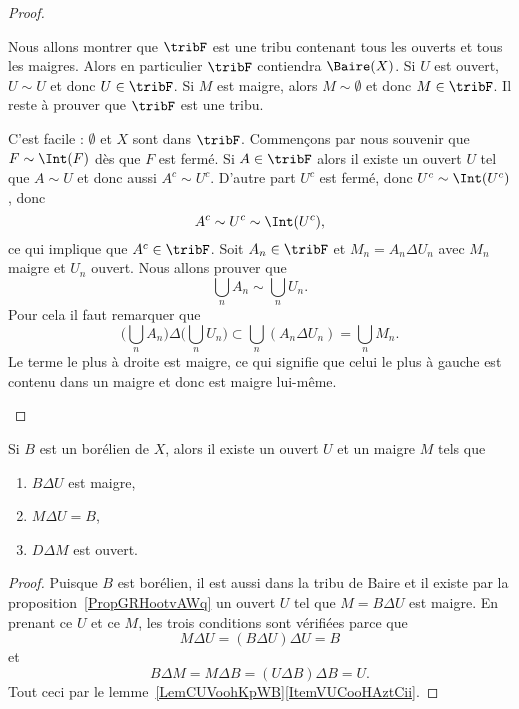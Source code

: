 \begin{proof}
\begin{subproof}
		Nous allons montrer que \( \tribF\) est une tribu contenant tous les ouverts et tous les maigres. Alors en particulier \( \tribF\) contiendra \( \Baire(X)\). Si \( U\) est ouvert, \( U\sim U\) et donc \( U\in\tribF\). Si \( M \) est maigre, alors \( M\sim\emptyset\) et donc \( M\in\tribF\). Il reste à prouver que \( \tribF\) est une tribu.
		\begin{subproof}
			 C'est facile : \( \emptyset\) et \( X\) sont dans \( \tribF\).
			\spitem[Comlémentaire] Commençons par nous souvenir que \( F\sim\Int(F)\) dès que \( F\) est fermé. Si \( A\in\tribF\) alors il existe un ouvert \( U\) tel que \( A\sim U\) et donc aussi \( A^c\sim U^c\). D'autre part \( U^c\) est fermé, donc \( U^c\sim\Int(U^c)\), donc
			\begin{equation}
				A^c\sim U^c\sim\Int(U^c),
			\end{equation}
			ce qui implique que \( A^c\in\tribF\).
			 Soit \( A_n\in\tribF\) et \( M_n=A_n\Delta U_n\) avec \( M_n\) maigre et \( U_n\) ouvert. Nous allons prouver que
			\begin{equation}
				\bigcup_nA_n\sim\bigcup_nU_n.
			\end{equation}
			Pour cela il faut remarquer que
			\begin{equation}
				\Big( \bigcup_nA_n \Big)\Delta\Big( \bigcup_nU_n \Big)\subset\bigcup_n(A_n\Delta U_n)=\bigcup_nM_n.
			\end{equation}
			Le terme le plus à droite est maigre, ce qui signifie que celui le plus à gauche est contenu dans un maigre et donc est maigre lui-même.
		\end{subproof}
	\end{subproof}
\end{proof}

\begin{proposition}
	Si \( B\) est un borélien de \( X\), alors il existe un ouvert \( U\) et un maigre \( M\) tels que
	\begin{enumerate}
		\item
		      \( B\Delta U\) est maigre,
		\item
		      \( M\Delta U=B\),
		\item
		      \( D\Delta M\) est ouvert.
	\end{enumerate}
\end{proposition}

\begin{proof}
	Puisque \( B\) est borélien, il est aussi dans la tribu de Baire et il existe par la proposition~\ref{PropGRHootvAWq} un ouvert \( U\) tel que \( M=B\Delta U\) est maigre. En prenant ce \( U\) et ce \( M\), les trois conditions sont vérifiées parce que
	\begin{equation}
		M\Delta U=(B\Delta U)\Delta U=B
	\end{equation}
	et
	\begin{equation}
		B\Delta M=M\Delta B=(U\Delta B)\Delta B=U.
	\end{equation}
	Tout ceci par le lemme~\ref{LemCUVoohKpWB}\ref{ItemVUCooHAztCii}.
\end{proof}

